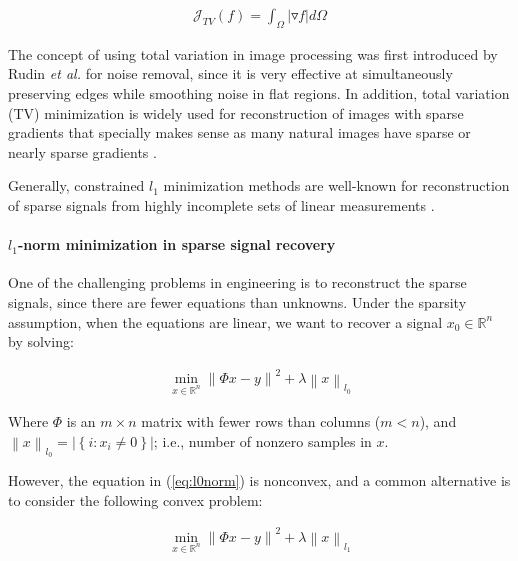 \begin{equation}
\begin{gathered}
\mathcal{J}_{TV}(f) = \int_{\Omega} |\triangledown f| d\Omega
\end{gathered}
\end{equation}

The concept of using total variation in image processing was first introduced by Rudin \emph{et al.} \cite{rudin1992nonlinear} for noise removal, since it is very effective at simultaneously preserving edges while smoothing noise in flat regions. In addition, total variation (TV) minimization is widely used for reconstruction of images with sparse gradients that specially makes sense as many natural images have sparse or nearly sparse gradients \cite{blomgren1998color}.

Generally, constrained $l_{1}$ minimization methods are well-known for reconstruction of sparse signals from highly incomplete sets of linear measurements \cite{candes2008enhancing}.

\paragraph{$l_{1}$-norm minimization in sparse signal recovery}
\label{section:l1minsection}

One of the challenging problems in engineering is to reconstruct the sparse signals, since there are fewer equations than unknowns. Under the sparsity assumption, when the equations are linear, we want to recover a signal $x_{0}\in \mathbb{R}^{n}$ by solving:

\begin{equation}
\label{eq:l0norm}
\begin{gathered}
\min_{x\in \mathbb{R}^{n}}\left\|\Phi x-y\right\|^{2} + \lambda \left \|x  \right \|_{l_{0}}
\end{gathered}
\end{equation}

Where $\Phi$ is an $m \times n$ matrix with fewer rows than columns ($m<n$), and $\left \| x \right \|_{l_{0}}=\left | \left \{ i:x_{i} \neq 0 \right \} \right |$; i.e., number of nonzero samples in $x$.

However, the equation in (\ref{eq:l0norm}) is nonconvex, and a common alternative is to consider the following convex problem:

\begin{equation}
\label{eq:l1norm}
\begin{gathered}
\min_{x\in \mathbb{R}^{n}}\left\|\Phi x-y\right\|^{2} + \lambda \left \|x  \right \|_{l_{1}}
\end{gathered}
\end{equation}

